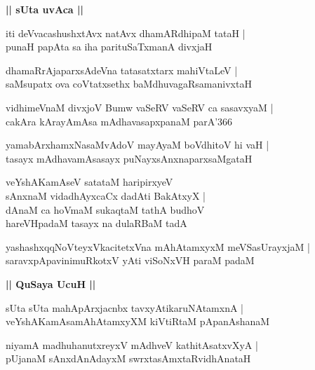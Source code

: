 \documentclass[twoside,12pt,openright]{book}
\newcounter{shloka}[chapter]
\def\uvaca#1{\centerline{{\large\textbf{#1}}}}
\begin{document}
\uvaca{|| sUta uvAca ||}

\begin{shloka}%
iti deVvacashushxtAvx natAvx dhamARdhipaM tataH |\\
punaH papAta sa iha parituSaTxmanA divxjaH 
\end{shloka}

\begin{shloka}%
dhamaRrAjaparxsAdeVna tatasatxtarx mahiVtaLeV |\\
saMsupatx ova coVtatxsethx baMdhuvagaRsamanivxtaH 
\end{shloka}

\begin{shloka}%
vidhimeVnaM divxjoV Bumw vaSeRV vaSeRV ca sasavxyaM |\\
cakAra kArayAmAsa mAdhavasapxpanaM parA\char'366
\end{shloka}

\begin{shloka}%
yamabArxhamxNasaMvAdoV mayAyaM boVdhitoV hi vaH |\\
tasayx mAdhavamAsasayx puNayxsAnxnaparxsaMgataH 
\end{shloka}

\begin{shloka}%
veYshAKamAseV satataM haripirxyeV \\
sAnxnaM vidadhAyxcaCx dadAti BakAtxyX |\\
dAnaM ca hoVmaM sukaqtaM tathA budhoV \\
hareVHpadaM tasayx na dulaRBaM tadA 
\end{shloka}

\begin{shloka}%
yashashxqqNoVteyxVkacitetxVna mAhAtamxyxM meVSasUrayxjaM |\\
saravxpApavinimuRkotxV yAti viSoNxVH paraM padaM 
\end{shloka}

\uvaca{|| QuSaya UcuH ||}

\begin{shloka}%
sUta sUta mahApArxjacnbx tavxyAtikaruNAtamxnA |\\
veYshAKamAsamAhAtamxyXM kiVtiRtaM pApanAshanaM 
\end{shloka}

\begin{shloka}%
niyamA madhuhanutxreyxV mAdhveV kathitAsatxvXyA |\\
pUjanaM sAnxdAnAdayxM swrxtasAmxtaRvidhAnataH 
\end{shloka}
\end{document}
